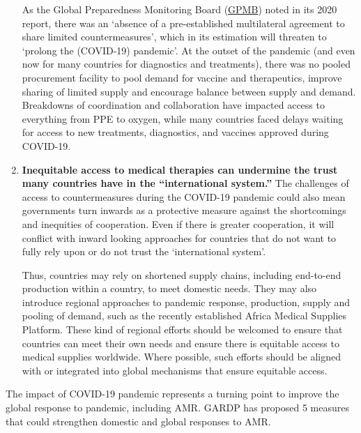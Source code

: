 \documentclass[
  11pt,
  paper=a4,
  ,captions=tableheading
]{scrartcl}
\begin{document}
\begin{enumerate}
  As the Global Preparedness Monitoring Board
  (\href{https://apps.who.int/gpmb/assets/annual_report/\%20GPMB_AR_2020_EN.pdf}{GPMB})
  noted in its 2020 report, there was an `absence of a pre-established
  multilateral agreement to share limited countermeasures', which in its
  estimation will threaten to `prolong the (COVID-19) pandemic'. At the
  outset of the pandemic (and even now for many countries for
  diagnostics and treatments), there was no pooled procurement facility
  to pool demand for vaccine and therapeutics, improve sharing of
  limited supply and encourage balance between supply and demand.
  Breakdowns of coordination and collaboration have impacted access to
  everything from PPE to oxygen, while many countries faced delays
  waiting for access to new treatments, diagnostics, and vaccines
  approved during COVID-19.
\item
  \textbf{Inequitable access to medical therapies can undermine the
  trust many countries have in the ``international system.''} The
  challenges of access to countermeasures during the COVID-19 pandemic
  could also mean governments turn inwards as a protective measure
  against the shortcomings and inequities of cooperation. Even if there
  is greater cooperation, it will conflict with inward looking
  approaches for countries that do not want to fully rely upon or do not
  trust the `international system'.

  Thus, countries may rely on shortened supply chains, including
  end-to-end production within a country, to meet domestic needs. They
  may also introduce regional approaches to pandemic response,
  production, supply and pooling of demand, such as the recently
  established Africa Medical Supplies Platform. These kind of regional
  efforts should be welcomed to ensure that countries can meet their own
  needs and ensure there is equitable access to medical supplies
  worldwide. Where possible, such efforts should be aligned with or
  integrated into global mechanisms that ensure equitable access.
\end{enumerate}

The impact of COVID-19 pandemic represents a turning point to improve
the global response to pandemic, including AMR. GARDP has proposed 5
measures that could strengthen domestic and global responses to AMR.
\end{document}
